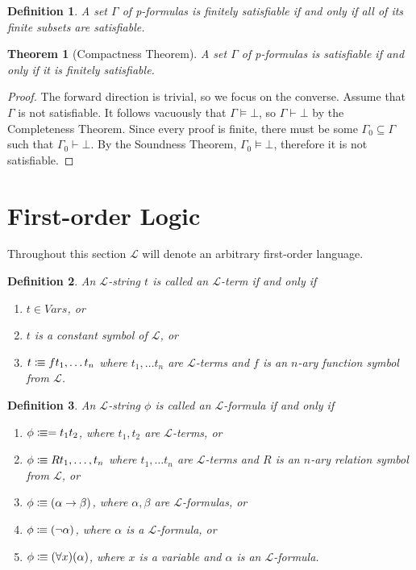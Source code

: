 \documentclass[leqno]{article}
\newtheorem{theorem}{Theorem}[section]
\newtheorem{definition}{Definition}[section]
\newcommand{\lang}{\mathcal{L}}
\newcommand{\proves}{\vdash}
\newcommand{\is}{\colonequiv}
\newcommand{\limplies}{\rightarrow}
\begin{document}
\begin{definition}
    A set $\Gamma$ of p-formulas is finitely satisfiable if and only if all of its finite subsets are satisfiable.
\end{definition}

\begin{theorem}[Compactness Theorem]
    A set $\Gamma$ of p-formulas is satisfiable if and only if it is finitely satisfiable.
\end{theorem}

\begin{proof}
   The forward direction is trivial, so we focus on the converse. Assume that $\Gamma$ is not satisfiable. It follows vacuously that $\Gamma \models \bot$, so $\Gamma \proves \bot$ by the Completeness Theorem. Since every proof is finite, there must be some $\Gamma_0 \subseteq \Gamma$ such that $\Gamma_0 \proves \bot$. By the Soundness Theorem, $\Gamma_0 \models \bot$, therefore it is not satisfiable.
\end{proof}

\section{First-order Logic}

Throughout this section $\lang$ will denote an arbitrary first-order language.

\begin{definition}
    An $\lang$-string $t$ is called an $\lang$-term if and only if 
    \begin{enumerate}
        \item $t \in Vars$, or
        \item $t$ is a constant symbol of $\lang$, or
        \item $t \is f t_1, \dots t_n$ where $t_1, \dots t_n$ are $\lang$-terms and $f$ is an $n$-ary function symbol from $\lang$.
    \end{enumerate}
\end{definition}

\begin{definition}
  An $\lang$-string $\phi$ is called an $\lang$-formula if and only if 
  
  \begin{enumerate}
      \item $\phi \is =t_1 t_2$, where $t_1, t_2$ are $\lang$-terms, or
      \item $\phi \is R t_1, \dots, t_n$ where $t_1, \dots t_n$ are $\lang$-terms and $R$ is an $n$-ary relation symbol from $\lang$, or
      \item $\phi \is (\alpha \limplies \beta)$, where $\alpha, \beta$ are $\lang$-formulas, or
      \item $\phi \is (\neg \alpha)$, where $\alpha$ is a $\lang$-formula, or
      \item $\phi \is (\forall x) (\alpha)$, where $x$ is a variable and $\alpha$ is an $\lang$-formula.
  \end{enumerate}
\end{definition}
\end{document}
